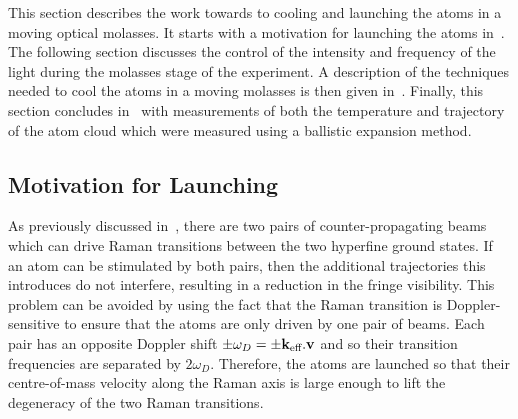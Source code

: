 \par\noindent
This section describes the work towards to cooling and launching the
atoms in a moving optical molasses. It starts with a motivation for
launching the atoms in~. The following
section discusses the control of the intensity and frequency of the
light during the molasses stage of the experiment. A description of
the techniques needed to cool the atoms in a moving molasses is then
given in~. Finally, this section
concludes in~ with measurements of
both the temperature and trajectory of the atom cloud which were
measured using a ballistic expansion method.


\subsection{Motivation for Launching}\label{subsec:launching}
As previously discussed in~, there
are two pairs of counter-propagating beams which can drive Raman
transitions between the two hyperfine ground states. If an atom can be
stimulated by both pairs, then the additional trajectories this
introduces do not interfere, resulting in a reduction in the fringe
visibility. This problem can be avoided by using the fact that the
Raman transition is Doppler-sensitive to ensure that the atoms are
only driven by one pair of beams. Each pair has an opposite Doppler
shift \(\pm \omega_D = \pm {\textbf k_\textnormal{eff}}.\textbf{v}\) and so their transition
frequencies are separated by \(2\omega_D\). Therefore, the atoms are
launched so that their centre-of-mass velocity along the Raman axis is
large enough to lift the degeneracy of the two Raman transitions. 

